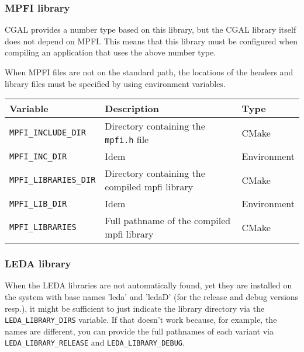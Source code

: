\subsubsection{MPFI library}

CGAL provides a number type based on this library, but the CGAL library
itself does not depend on MPFI. This means that this library must be
configured when compiling an application that uses the above number type.

When MPFI files are not on the standard path, the locations of the headers
and library files must be specified by using environment variables.

{\ccTexHtml{\small}{}
\renewcommand{\arraystretch}{1.3}
\gdef\lcTabularBorder{2}
\begin{tabular}{|l|l|l|} \hline
  \textbf{Variable}             & \textbf{Description}                                  & \textbf{Type}\\\hline\hline
  \texttt{MPFI\_INCLUDE\_DIR}   & Directory containing the \texttt{mpfi.h} file         & CMake\\\hline
  \texttt{MPFI\_INC\_DIR}       & Idem                                                  & Environment\\\hline
  \texttt{MPFI\_LIBRARIES\_DIR} & Directory containing the compiled mpfi library        & CMake\\\hline
  \texttt{MPFI\_LIB\_DIR}       & Idem                                                  & Environment\\\hline
  \texttt{MPFI\_LIBRARIES}      & Full pathname of the compiled mpfi library            & CMake\\\hline
\end{tabular}
}

\subsubsection{LEDA library}

When the LEDA libraries are not automatically found, yet they are installed on the system
with base names 'leda' and 'ledaD' (for the release and debug versions resp.), it might 
be sufficient to just indicate the library directory via the \texttt{LEDA\_LIBRARY\_DIRS} variable.
If that doesn't work because, for example, the names are different, you can provide the full pathnames of each variant
via \texttt{LEDA\_LIBRARY\_RELEASE} and \texttt{LEDA\_LIBRARY\_DEBUG}.

